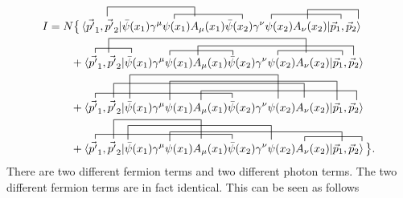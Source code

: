\begin{example}
\begin{equation}
\begin{split}
			\contraction{,,,I=N\vec{p'},\vec{k'}|\bar{\psi}(x_1)\gamma^\mu}{,,\psi(x_1)}{A_\mu(x_1)}{\bar{\psi}(x_2)}
			\contraction{,,,,,,,,,,,,,,,,,,,,,,,,,,,,,,,,,,,,,,,,,,,}{\psi(x_2)}{,A_\nu(x_2)|,,}{\vec{p}}
			\contraction[2ex]{,,,,,,,,,,,,}{\vec{k'}}{,,,,,,,,,,,,,}{A_\mu(x_1)}
			\contraction[2ex]{,,,,.,,,,,,,,,,,,,,,,,,,,,,,,,,,,,,,,,,,,,,,,,,,,,}{A_\nu(x_2)}{,,,,,,}{\vec{k}}
			I&=N\big\{\braket{\vec{p'}_1,\vec{p'}_2|\bar{\psi}(x_1)\gamma^\mu\psi(x_1)A_\mu(x_1)\bar{\psi}(x_2)\gamma^\nu\psi(x_2)A_\nu(x_2)|\vec{p}_1,\vec{p}_2}\\
			&\qquad
			\contraction{,,,,}{\vec{p'}}{,,,\vec{k'}|}{\bar{\psi}}
			\contraction{,,,,,,,,,,,,,,,,,}{\psi(x_1)}{A_\mu(x_1)}{\bar{\psi}(x_2)}
			\contraction{,,,,,,,,,,,.,,,,,,,,,,,,,,,,,,,,,,,,,,,}{\psi(x_2)}{,,A_\nu(x_2)|}{\vec{p}}
			\contraction[3ex]{,,,,,.,}{\vec{k'}}{,,,,,,,,,,,,,,,,,,,,,,,,,,,,,,,,,,,}{A_\mu(x_2)}
			\contraction[2ex]{,,,,,,,,,,,,,,,,,,,,,,}{A_\nu(x_1)}{,,,,,,,,,,,,,,,,,,,,,,,,,,,}{\vec{k}}
			+\braket{\vec{p'}_1,\vec{p'}_2|\bar{\psi}(x_1)\gamma^\mu\psi(x_1)A_\mu(x_1)\bar{\psi}(x_2)\gamma^\nu\psi(x_2)A_\nu(x_2)|\vec{p}_1,\vec{p}_2}\\
			&\qquad
			\contraction{,,,,}{\vec{p'}}{,,,,,.,,,,,,,,,,,,,,,,,,}{\bar{\psi}(x_2)}
			\contraction[5ex]{,,,,,,,,,}{\bar{\psi}(x_1)}{,,,,,,,,,,,,,,,,,,,,,,,,}{\psi(x_2)}
			\contraction[4ex]{,,,,,,,,,,,,,,,,,}{\psi(x_1)}{,,,,,,,,,,,,,,,,,,,,,,,,,,,,,,}{\vec{p}}
			\contraction[3ex]{,,,,,.,,}{\vec{k'}}{,,,,,,,,,,,.,,,,,,,,,,,,,,,,,,,,,,}{A_\mu(x_2)}
			\contraction[2ex]{,,,,,.,,,,,,,,,,,,,,,,,}{A_\nu(x_1)}{,,,,,,,,,,,,,,,,,,,,,,,,,,,}{\vec{k}}
			+\braket{\vec{p'}_1,\vec{p'}_2|\bar{\psi}(x_1)\gamma^\mu\psi(x_1)A_\mu(x_1)\bar{\psi}(x_2)\gamma^\nu\psi(x_2)A_\nu(x_2)|\vec{p}_1,\vec{p}_2}\\	
			&\qquad
			\contraction{,,,,}{\vec{p'}}{,,,,.,,,,,,,,,,,,,,,,,,,}{\bar{\psi}(x_2)}
			\contraction[3ex]{,,,,,.,,,}{\bar{\psi}(x_1)}{,,,,,,,,,,,,,,,,,,,,,,,}{\psi(x_2)}
			\contraction[2ex]{,,,,,,,,,,,,,,,,,}{\psi(x_1)}{,,,,,,,,,,,,,,,,,,,,,,,,,,,,,,,}{\vec{p}}
			\contraction{,,,,,,,,,,,,,,,,,,,,,,,,,,,,,,,,,,,,,,,,,,,,}{\psi(x_2)}{,,,,,,,,}{\vec{p}}
			\contraction[4ex]{,,,.,,,,}{\vec{k'}}{,,,,,,,,,,,,,}{A_\mu(x_1)}
			+\braket{\vec{p'}_1,\vec{p'}_2|\bar{\psi}(x_1)\gamma^\mu\psi(x_1)A_\mu(x_1)\bar{\psi}(x_2)\gamma^\nu\psi(x_2)A_\nu(x_2)|\vec{p}_1,\vec{p}_2}\big\}.\\
		\end{split}
		\label{I}
	\end{equation} 
	There are two different fermion terms and two different photon terms. The two different fermion terms are in fact identical. This can be seen as follows

\end{example}
